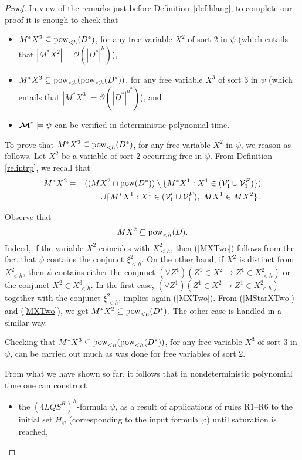 \documentclass{fundam}
\newcommand{\Hf}{H_{\varphi}}
\newcommand{\model}{\ensuremath{\mbox{\boldmath $\mathcal{M}$}}\xspace}
\newcommand{\pow}{\mbox{\rm pow}}
\newcommand{\QLQSR}{\ensuremath{\mbox{$4\mathit{LQS}^{R}$}}\xspace}
\begin{document}
\begin{proof}
In view of the remarks just before Definition~\ref{def:hlang}, to
complete our proof it is enough to check that
\begin{itemize}
\item $M^* X^2 \subseteq \pow_{< h}(D^*)$, for any free variable $X^2$
of sort 2 in $\psi$ (which entails that $|M^* X^2| =
\mathcal{O}(|D^{*}|^{h})$),

\item $M^* X^3 \subseteq \pow_{< h}(\pow_{< h}(D^*))$, for any free
variable $X^3$ of sort 3 in $\psi$ (which entails that $|M^* X^3| =
\mathcal{O}(|D^{*}|^{h^{2}})$), and

\item $\model^* \models \psi$ can be verified in deterministic
polynomial time.
\end{itemize}

To prove that $M^* X^2 \subseteq \pow_{< h}(D^*)$, for any free
variable $X^2$ in $\psi$, we reason as follows.  Let $X^2$ be a
variable of sort 2 occurring free in $\psi$.  From Definition
\ref{relintrp}, we recall that
\begin{eqnarray}
M^{*}X^2  &=&
    ((MX^2 \cap \pow(D^{*})) \setminus \{M^{*}X^1: X^1 \in ({\cal V}'_{1}\cup {\cal V}_1^F)\})
    \notag\\
     & & \qquad\cup \{M^{*}X^1: X^1 \in ({\cal V}'_{1} \cup {\cal
     V}_1^F),~MX^1 \in MX^2\}\, . \label{MStarXTwo}
\end{eqnarray}

Observe that
\begin{equation}
    MX^2 \subseteq \pow_{< h}(D). \label{MXTwo}
\end{equation}
Indeed, if the variable $X^2$ coincides with $X_{< h}^2$, then
(\ref{MXTwo}) follows from the fact that $\psi$ contains the conjunct
$\xi_{< h}^2$.  On the other hand, if $X^2$ is distinct from $X_{<
h}^2$, then $\psi$ contains either the conjunct $(\forall Z^1)(Z^1 \in X^2
\rightarrow Z^1 \in X_{< h}^2)$ or the conjunct $X^2 \in X_{< h}^3$. In the first case,
$(\forall Z^1)(Z^1 \in X^2
\rightarrow Z^1 \in X_{< h}^2)$ together with the conjunct
$\xi_{< h}^2$, implies again (\ref{MXTwo}).
From (\ref{MStarXTwo}) and (\ref{MXTwo}), we get $M^* X^2 \subseteq
\pow_{< h}(D^*)$. The other case is handled in a similar way.

Checking that $M^* X^3 \subseteq \pow_{< h}(\pow_{< h}(D^*))$, for any
free variable $X^3$ of sort 3 in $\psi$, can be carried out much as
was done for free variables of sort 2.

From what we have shown so far, it follows that
in nondeterministic polynomial time one can construct
\begin{itemize}
    \item the $(\QLQSR)^{h}$-formula $\psi$, as a result of
    applications of rules R1--R6 to the initial set $\Hf$
    (corresponding to the input formula $\varphi$) until saturation is
    reached,


\end{itemize}
\end{proof}
\end{document}
